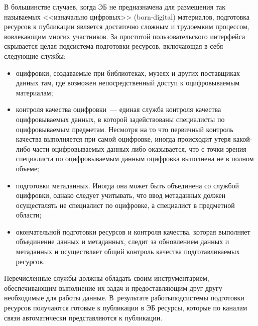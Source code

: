 \begin{multicols}{2}
  В большинстве случаев, когда ЭБ не предназначена для размещения так называемых 
<<изначально цифровых>> (born-digital) материалов, подготовка ресурсов к публикации 
является достаточно сложным и трудоемким процессом, вовлекающим многих участников. 
За простотой пользовательского интерфейса скрывается целая подсистема подготовки 
ресурсов, включающая в себя следующие службы:
  \begin{itemize}
\item оцифровки, создаваемые при библиотеках, музеях и других 
поставщиках данных там, где возможен непосредственный доступ к оцифровываемым 
материалам;
\item контроля качества оцифровки~--- единая служба контроля качества 
оциф\-ро\-вы\-ва\-емых данных, в которой задействованы специалисты по оцифровываемым 
предметам. Не\-смот\-ря на то что первичный контроль качества выполняется при самой 
оцифровке, иногда происходит утеря какой-либо части оциф\-ро\-вы\-ва\-емых данных либо 
оказывается, что с точки зрения специалиста по оциф\-ро\-вы\-ва\-емым данным оциф\-ров\-ка 
выполнена не в полном объеме;
\item подготовки метаданных. Иногда она может быть объединена со службой 
оцифровки, однако следует учитывать, что ввод метаданных должен осуществлять не 
специалист по оциф\-ров\-ке, а специалист в предметной области;
\item окончательной подготовки ресурсов и контроля качества, которая выполняет 
объединение данных и метаданных, следит за об\-нов\-ле\-ни\-ем данных и метаданных и 
осуществляет общий контроль качества подготавливаемых ресурсов.
\end{itemize}

  Перечисленные службы должны обладать своим инструментарием, обеспечивающим 
выполнение их задач и предоставляющим друг другу необходимые для работы данные. 
В~результате работы\linebreak подсистемы подготовки ресурсов получаются готовые к публикации в 
ЭБ ресурсы, которые по каналам связи автоматически представляются к пуб\-ли\-кации.

\vspace*{-6pt}

\begin{figure*} %
\vspace*{1pt}
\begin{center}
\mbox{%
\epsfxsize=150.641mm
}
\end{center}
\vspace*{-12pt}
\vspace*{-6pt}
\end{figure*}


\end{multicols}
